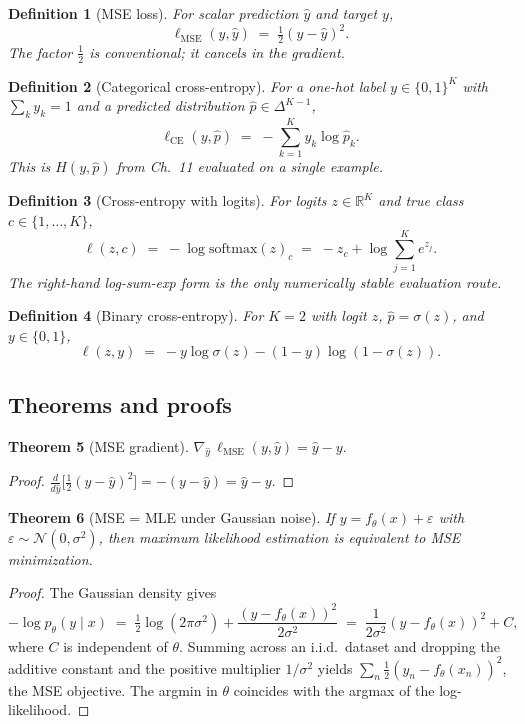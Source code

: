 \documentclass[11pt]{article}
\newtheorem{theorem}{Theorem}[section]
\newtheorem{definition}[theorem]{Definition}
\theoremstyle{remark}
\begin{document}
\begin{definition}[MSE loss]
For scalar prediction $\hat y$ and target $y$,
\[
\ell_{\mathrm{MSE}}(y, \hat y) \;=\; \tfrac{1}{2}(y - \hat y)^2.
\]
The factor $\tfrac12$ is conventional; it cancels in the gradient.
\end{definition}

\begin{definition}[Categorical cross-entropy]
For a one-hot label $y \in \{0,1\}^K$ with $\sum_k y_k = 1$ and a predicted distribution
$\hat p \in \Delta^{K-1}$,
\[
\ell_{\mathrm{CE}}(y, \hat p) \;=\; -\sum_{k=1}^K y_k \log \hat p_k.
\]
This is $H(y, \hat p)$ from Ch.~11 evaluated on a single example.
\end{definition}

\begin{definition}[Cross-entropy with logits]
For logits $z \in \mathbb{R}^K$ and true class $c \in \{1,\dots,K\}$,
\[
\ell(z, c) \;=\; -\log \mathrm{softmax}(z)_c \;=\; -z_c + \log \sum_{j=1}^K e^{z_j}.
\]
The right-hand log-sum-exp form is the only numerically stable evaluation route.
\end{definition}

\begin{definition}[Binary cross-entropy]
For $K=2$ with logit $z$, $\hat p = \sigma(z)$, and $y \in \{0,1\}$,
\[
\ell(z, y) \;=\; -y \log \sigma(z) - (1-y)\log(1-\sigma(z)).
\]
\end{definition}

\subsection*{Theorems and proofs}

\begin{theorem}[MSE gradient]
$\nabla_{\hat y}\, \ell_{\mathrm{MSE}}(y, \hat y) = \hat y - y.$
\end{theorem}
\begin{proof}
$\frac{d}{d\hat y}\bigl[\tfrac12 (y-\hat y)^2\bigr] = -(y-\hat y) = \hat y - y$.
\end{proof}

\begin{theorem}[MSE = MLE under Gaussian noise]
If $y = f_\theta(x) + \varepsilon$ with $\varepsilon \sim \mathcal{N}(0, \sigma^2)$, then maximum likelihood
estimation is equivalent to MSE minimization.
\end{theorem}
\begin{proof}
The Gaussian density gives
\[
-\log p_\theta(y \mid x)
\;=\; \tfrac12 \log(2\pi\sigma^2) + \frac{(y - f_\theta(x))^2}{2\sigma^2}
\;=\; \frac{1}{2\sigma^2} (y - f_\theta(x))^2 + C,
\]
where $C$ is independent of $\theta$. Summing across an i.i.d.\ dataset and dropping the additive constant
and the positive multiplier $1/\sigma^2$ yields $\sum_n \tfrac12 (y_n - f_\theta(x_n))^2$, the MSE objective.
The argmin in $\theta$ coincides with the argmax of the log-likelihood.
\end{proof}
\end{document}
